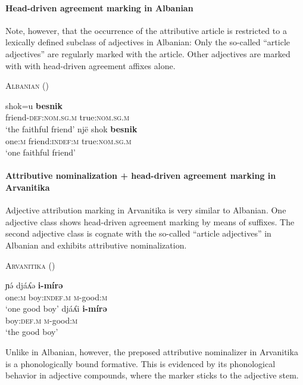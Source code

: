 \paragraph{Head-driven agreement marking in Albanian}
Note, however, that the occurrence of the attributive article is restricted to a lexically defined subclass of adjectives in Albanian: Only the so-called “article adjectives” are regularly marked with the article. Other adjectives are marked with with head-driven agreement affixes alone.
\begin{exe}
\ex \textsc{Albanian} (\citealt[167]{himmelmann1997})
\begin{xlist}
\ex
\gll	shok=u					\textbf{besnik}\\
	friend-\textsc{def:nom.sg.m} 	true:\textsc{nom.sg.m}\\
\glt	‘the faithful friend’
\ex
\gll 	nj\"e			shok					\textbf{besnik}\\
	one:\textsc{m}	friend:\textsc{indef:m} 	true:\textsc{nom.sg.m}\\
\glt	‘one faithful friend’
\end{xlist}
\end{exe}

\paragraph{Attributive nominalization + head-driven agreement marking in Arvanitika}
Adjective attribution marking in Arvanitika is very similar to Albanian. One adjective class shows head-driven agreement marking by means of suffixes. The second adjective class is cognate with the so-called “article adjectives” in Albanian and exhibits attributive nominalization. 
\begin{exe}
\ex \textsc{Arvanitika} (\citealt[303]{sasse1991})
\begin{xlist}
\ex
\gll	ɲə́ 			djáʎə 			\textbf{i-mírə}\\
	one:\textsc{m} 	boy:\textsc{indef.m} 	\textsc{m}-good:\textsc{m}\\
\glt	‘one good boy’
\ex
\gll				djáʎi 				\textbf{i-mírə}\\
				boy:\textsc{def.m} 	\textsc{m}-good:\textsc{m}\\
\glt	‘the good boy’
\end{xlist}
\end{exe}
Unlike in Albanian, however, the preposed attributive nominalizer in Arvanitika is a phonologically bound formative. This is evidenced by its phonological behavior in adjective compounds, where the marker sticks to the adjective stem.

